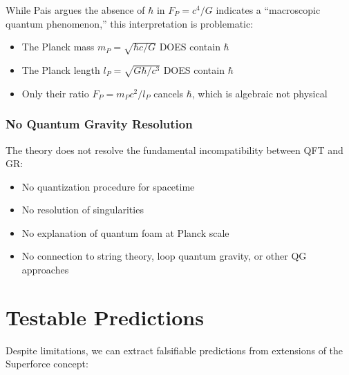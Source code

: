 While Pais argues the absence of $\hbar$ in $F_P = c^4/G$ indicates a ``macroscopic quantum phenomenon,'' this interpretation is problematic:
\begin{itemize}
\item The Planck mass $m_P = \sqrt{\hbar c/G}$ DOES contain $\hbar$
\item The Planck length $l_P = \sqrt{G\hbar/c^3}$ DOES contain $\hbar$
\item Only their ratio $F_P = m_P c^2/l_P$ cancels $\hbar$, which is algebraic not physical
\end{itemize}

\subsubsection{No Quantum Gravity Resolution}

The theory does not resolve the fundamental incompatibility between QFT and GR:
\begin{itemize}
\item No quantization procedure for spacetime
\item No resolution of singularities
\item No explanation of quantum foam at Planck scale
\item No connection to string theory, loop quantum gravity, or other QG approaches
\end{itemize}

\section{Testable Predictions}

Despite limitations, we can extract falsifiable predictions from extensions of the Superforce concept:

